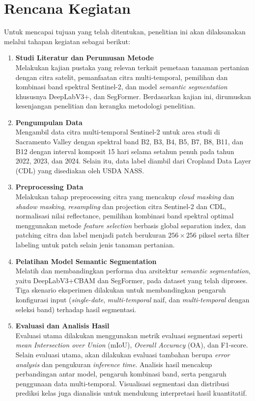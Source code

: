 \section{Rencana Kegiatan}
Untuk mencapai tujuan yang telah ditentukan, penelitian ini akan dilaksanakan melalui tahapan kegiatan sebagai berikut:
\begin{enumerate}
    \item \textbf{Studi Literatur dan Perumusan Metode}\\
    Melakukan kajian pustaka yang relevan terkait pemetaan tanaman pertanian dengan citra satelit, pemanfaatan citra multi-temporal, pemilihan dan kombinasi band spektral Sentinel-2, dan model \textit{semantic segmentation} khususnya DeepLabV3+, dan SegFormer. Berdasarkan kajian ini, dirumuskan kesenjangan penelitian dan kerangka metodologi penelitian.
    
    \item \textbf{Pengumpulan Data}\\
    Mengambil data citra multi-temporal Sentinel-2 untuk area studi di Sacramento Valley dengan spektral band B2, B3, B4, B5, B7, B8, B11, dan B12 dengan interval komposit 15 hari selama setahun penuh pada tahun 2022, 2023, dan 2024. Selain itu, data label diambil dari Cropland Data Layer (CDL) yang disediakan oleh USDA NASS.
    
    \item \textbf{Preprocessing Data}\\
    Melakukan tahap preprocessing citra yang mencakup \textit{cloud masking} dan \textit{shadow masking}, \textit{resampling} dan projection citra Sentinel-2 dan CDL, normalisasi nilai reflectance, pemilihan kombinasi band spektral optimal menggunakan metode \textit{feature selection} berbasis global separation index, dan patching citra dan label menjadi patch berukuran $256\times256$ piksel serta filter labeling untuk patch selain jenis tanaman pertanian.
    
    \item \textbf{Pelatihan Model Semantic Segmentation}\\
    Melatih dan membandingkan performa dua arsitektur \textit{semantic segmentation}, yaitu DeepLabV3+CBAM dan SegFormer, pada dataset yang telah diproses. Tiga skenario eksperimen dilakukan untuk membandingkan pengaruh konfigurasi input (\textit{single-date}, \textit{multi-temporal} naif, dan \textit{multi-temporal} dengan seleksi band) terhadap hasil segmentasi.
    
    \item \textbf{Evaluasi dan Analisis Hasil}\\
    Evaluasi utama dilakukan menggunakan metrik evaluasi segmentasi seperti \textit{mean Intersection over Union} (mIoU), \textit{Overall Accuracy} (OA), dan F1-score. Selain evaluasi utama, akan dilakukan evaluasi tambahan berupa \textit{error analysis} dan pengukuran \textit{inference time}. Analisis hasil mencakup perbandingan antar model, pengaruh kombinasi band, serta pengaruh penggunaan data multi-temporal. Visualisasi segmentasi dan distribusi prediksi kelas juga dianalisis untuk mendukung interpretasi hasil kuantitatif.
    

\end{enumerate}
